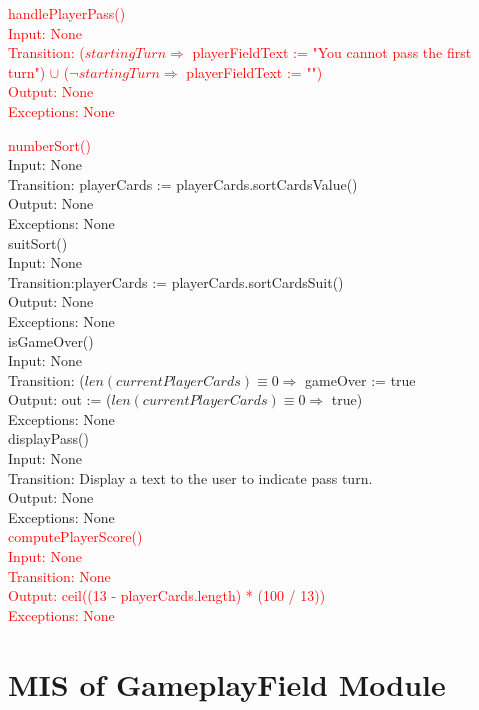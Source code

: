 \documentclass[12pt, titlepage]{article}
\begin{document}
\noindent \textcolor{red}{handlePlayerPass()\\
Input: None\\
Transition: ($startingTurn \Rightarrow$ playerFieldText := "You cannot pass the first turn") $\cup$ ($\neg startingTurn  \Rightarrow$ playerFieldText := "")\\
Output: None\\
Exceptions: None \\
}

\noindent \textcolor{red}{numberSort()}\\
Input: None\\
Transition: playerCards := playerCards.sortCardsValue()\\
Output: None\\
Exceptions: None \\


\noindent suitSort()\\
Input: None\\
Transition:playerCards := playerCards.sortCardsSuit() \\
Output: None\\
Exceptions: None \\

\noindent isGameOver() \\
Input: None\\
Transition: ($ len(currentPlayerCards) \equiv 0 \Rightarrow$ gameOver := true\\
Output: out := ($ len(currentPlayerCards) \equiv 0 \Rightarrow$ true)\\
Exceptions: None \\

\noindent displayPass() \\
Input: None\\
Transition: Display a text to the user to indicate pass turn. \\
Output: None\\
Exceptions: None \\

\noindent \textcolor{red}{computePlayerScore() \\
Input: None\\
Transition: None\\
Output: ceil((13 - playerCards.length) * (100 / 13))\\
Exceptions: None \\
}

\section{MIS of GameplayField Module}
\end{document}
